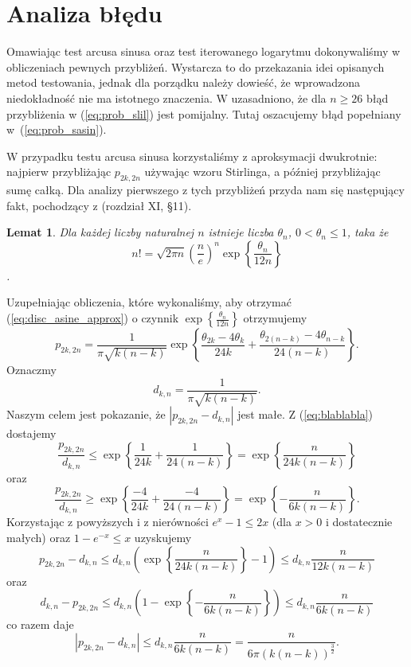 \documentclass[a4paper,11pt,twoside]{book}
\newtheorem{lemat}[twier]{Lemat}
\theoremstyle{definition}
\begin{document}
\section{Analiza błędu}
Omawiając test arcusa sinusa oraz test iterowanego logarytmu dokonywaliśmy w obliczeniach pewnych przybliżeń. Wystarcza to do przekazania idei opisanych metod testowania, jednak dla porządku należy dowieść, że wprowadzona niedokładność nie ma istotnego znaczenia. W \cite{wang-nic} uzasadniono, że dla $n \geq 26$ błąd przybliżenia w (\ref{eq:prob_slil}) jest pomijalny. Tutaj oszacujemy błąd popełniany w~(\ref{eq:prob_sasin}).

W przypadku testu arcusa sinusa korzystaliśmy z aproksymacji dwukrotnie: najpierw przybliżając $p_{2k,2n}$ używając wzoru Stirlinga, a później przybliżając sumę całką. Dla analizy pierwszego z tych przybliżeń przyda nam się następujący fakt, pochodzący z \cite{leja} (rozdział XI, \S11).
\begin{lemat}
 Dla każdej liczby naturalnej $n$ istnieje liczba $\theta_n$, $0 < \theta_n \leq 1$, taka że
 \[ n! = \sqrt{2\pi n} \left( \frac{n}{e} \right)^n \exp\left\{\frac{\theta_n}{12n}\right\} \].
\end{lemat}
Uzupełniając obliczenia, które wykonaliśmy, aby otrzymać (\ref{eq:disc_asine_approx}) o czynnik $\exp\left\{\frac{\theta_n}{12n}\right\}$ otrzymujemy
\begin{equation}
 \label{eq:blablabla}
 p_{2k,2n} = \frac{1}{\pi \sqrt{k(n-k)}} \exp\left\{ \frac{\theta_{2k} - 4\theta_k}{24k} + \frac{\theta_{2(n-k)} - 4\theta_{n-k}}{24(n-k)} \right\}.
\end{equation}
Oznaczmy
\[ d_{k,n} = \frac{1}{\pi \sqrt{k(n-k)}}. \]
Naszym celem jest pokazanie, że $|p_{2k,2n} - d_{k,n}|$ jest małe. Z (\ref{eq:blablabla}) dostajemy
\[ \frac{p_{2k,2n}}{d_{k,n}} \leq \exp\left\{ \frac{1}{24k} + \frac{1}{24(n-k)} \right\} = \exp\left\{ \frac{n}{24k(n-k)} \right\} \]
oraz
\[ \frac{p_{2k,2n}}{d_{k,n}} \geq \exp\left\{ \frac{-4}{24k} + \frac{-4}{24(n-k)} \right\} = \exp\left\{ -\frac{n}{6k(n-k)} \right\}. \]
Korzystając z powyższych i z nierówności $e^x - 1 \leq 2x$ (dla $x > 0$ i dostatecznie małych) oraz $1 - e^{-x} \leq x$ uzyskujemy
\[ p_{2k,2n} - d_{k,n} \leq d_{k,n} \left(\exp\left\{ \frac{n}{24k(n-k)} \right\} - 1\right) \leq d_{k,n}\frac{n}{12k(n-k)} \]
oraz 
\[ d_{k,n} - p_{2k,2n} \leq d_{k,n} \left( 1 -\exp\left\{ -\frac{n}{6k(n-k)} \right\} \right) \leq d_{k,n}\frac{n}{6k(n-k)} \]
co razem daje 
\[ |p_{2k,2n} - d_{k,n}| \leq  d_{k,n}\frac{n}{6k(n-k)} = \frac{n}{6\pi\left( k(n-k) \right)^{\frac{3}{2}}}. \]
\end{document}
